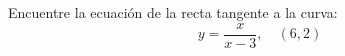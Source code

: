\setcounter{enumi}{37}
\item Encuentre la ecuación de la recta tangente a la curva:
$$y = \frac{x}{x - 3}, \quad (6, 2)$$
